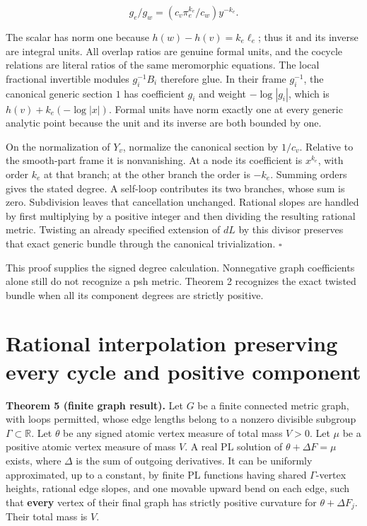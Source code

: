 \documentclass[
  11pt,
]{article}
\begin{document}
\[
g_e/g_w=(c_v\pi_e^{k_e}/c_w)y^{-k_e}.
\]

The scalar has norm one because \(h(w)-h(v)=k_e\ell_e\); thus it and its
inverse are integral units. All overlap ratios are genuine formal units,
and the cocycle relations are literal ratios of the same meromorphic
equations. The local fractional invertible modules \(g_i^{-1}B_i\)
therefore glue. In their frame \(g_i^{-1}\), the canonical generic
section \(1\) has coefficient \(g_i\) and weight \(-\log|g_i|\), which
is \(h(v)+k_e(-\log|x|)\). Formal units have norm exactly one at every
generic analytic point because the unit and its inverse are both bounded
by one.

On the normalization of \(Y_v\), normalize the canonical section by
\(1/c_v\). Relative to the smooth-part frame it is nonvanishing. At a
node its coefficient is \(x^{k_e}\), with order \(k_e\) at that branch;
at the other branch the order is \(-k_e\). Summing orders gives the
stated degree. A self-loop contributes its two branches, whose sum is
zero. Subdivision leaves that cancellation unchanged. Rational slopes
are handled by first multiplying by a positive integer and then dividing
the resulting rational metric. Twisting an already specified extension
of \(dL\) by this divisor preserves that exact generic bundle through
the canonical trivialization. \(\square\)

This proof supplies the signed degree calculation. Nonnegative graph
coefficients alone still do not recognize a psh metric. Theorem 2
recognizes the exact twisted bundle when all its component degrees are
strictly positive.

\section{Rational interpolation preserving every cycle and positive
component}\label{rational-interpolation-preserving-every-cycle-and-positive-component}

\textbf{Theorem 5 (finite graph result).} Let \(G\) be a finite
connected metric graph, with loops permitted, whose edge lengths belong
to a nonzero divisible subgroup \(\Gamma\subset\mathbb R\). Let
\(\theta\) be any signed atomic vertex measure of total mass \(V>0\).
Let \(\mu\) be a positive atomic vertex measure of mass \(V\). A real PL
solution of \(\theta+\Delta F=\mu\) exists, where \(\Delta\) is the sum
of outgoing derivatives. It can be uniformly approximated, up to a
constant, by finite PL functions having shared \(\Gamma\)-vertex
heights, rational edge slopes, and one movable upward bend on each edge,
such that \textbf{every} vertex of their final graph has strictly
positive curvature for \(\theta+\Delta F_j\). Their total mass is \(V\).
\end{document}

